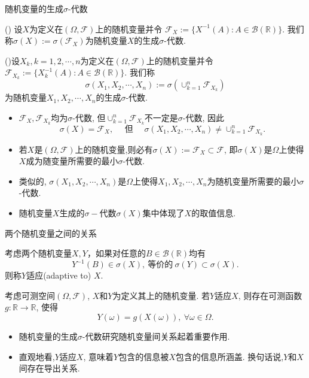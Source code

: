 \begin{frame}{随机变量的生成$\sigma$-代数}
	\begin{defi}
	() 设$X$为定义在$(\Omega,\mathcal{F})$上的随机变量并令
	$\mathcal{F}_X:=\{X^{-1}(A):A\in \mathcal{B}(\mathbb{R})\}$. 我们称$\sigma(X):=\sigma\left(\mathcal{F}_{X}\right)$为随机变量$X$的生成$\sigma$-代数.
	\end{defi}
	\pause

\begin{defi}
  ()设$X_k, k=1,2,\cdots, n$为定义在$(\Omega,\mathcal{F})$上的随机变量并令
  $\mathcal{F}_{X_k}:=\{X_k^{-1}(A):A\in \mathcal{B}(\mathbb{R})\}$. 我们称\[\sigma(X_1,X_2,\cdots,X_n):=\sigma\left(\cup_{k=1}^n\mathcal{F}_{X_k}\right)\]为随机变量$X_1,X_2,\cdots,X_n$的生成$\sigma$-代数.
\end{defi}
\pause
\begin{itemize}[<+-|alert@+>]
	\item $\mathcal{F}_{X}, \mathcal{F}_{X_k}$均为$\sigma$-代数, 但$\cup_{k=1}^n\mathcal{F}_{X_k}$不一定是$\sigma$-代数, 因此
	\[\sigma(X)=\mathcal{F}_X, \quad \mbox{ 但  } \quad  \sigma(X_1,X_2,\cdots,X_n)\neq \cup_{k=1}^n\mathcal{F}_{X_k}.\]
	\item 若$X$是$(\Omega,\mathcal{F})$上的随机变量,则必有$\sigma(X):=\mathcal{F}_X\subset\mathcal{F}$, 即$\sigma(X)$是$\Omega$上使得$X$成为随变量所需要的最小$\sigma$-代数.
	\item 类似的, $\sigma(X_1,X_2,\cdots,X_n)$是$\Omega$上使得$X_1,X_2,\cdots,X_n$为随机变量所需要的最小$\sigma$-代数.
	\item 随机变量$X$生成的$\sigma-$代数$\sigma(X)$集中体现了$X$的取值信息.
\end{itemize}
\end{frame}
\begin{frame}{两个随机变量之间的关系}
\begin{defi}
考虑两个随机变量$X, Y$，如果对任意的$B\in\mathcal{B}(\mathbb{R})$均有
\[
Y^{-1}(B) \in \sigma(X),\ \mbox{等价的}\ \sigma(Y)\subset \sigma(X).
\]则称$Y$适应(adaptive to) $X$.
\end{defi}

\pause

\begin{thm}
考虑可测空间$(\Omega, \mathcal{F})$, $X$和$Y$为定义其上的随机变量. 若$Y$适应$X$, 则存在可测函数$g: \mathbb{R} \rightarrow \mathbb{R}$, 使得
\[
Y(\omega)=g(X(\omega)),  \ \forall \omega \in \Omega .
\]
\end{thm}

\pause

\begin{rmk}
	\begin{itemize}[<+-|alert@+>]
		\item 随机变量的生成$\sigma$-代数研究随机变量间关系起着重要作用.
		\item 直观地看,$Y$适应$X$, 意味着$Y$包含的信息被$X$包含的信息所涵盖. 换句话说,$Y$和$X$间存在导出关系.
	\end{itemize}
\end{rmk}



\end{frame}
